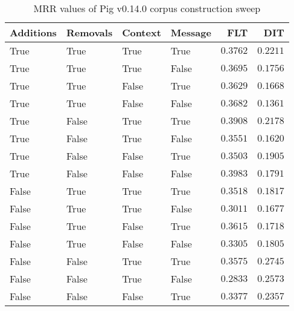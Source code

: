 
\begin{table}
\begin{spacing}{1.2}
\centering
\caption{MRR values of Pig v0.14.0 corpus construction sweep}
\label{table:pig_corpus_sweep}
\vspace{0.2em}
\begin{tabular}{llll|rr}
\toprule
Additions & Removals & Context & Message & FLT &        DIT \\
\midrule
     True &     True &    True &    True &         $0.3762$ &      $0.2211$ \\
     True &     True &    True &   False &         $0.3695$ &      $0.1756$ \\
     True &     True &   False &    True &         $0.3629$ &      $0.1668$ \\
     True &     True &   False &   False &         $0.3682$ &      $0.1361$ \\
     True &    False &    True &    True &         $0.3908$ &      $0.2178$ \\
     True &    False &    True &   False &         $0.3551$ &      $0.1620$ \\
     True &    False &   False &    True &         $0.3503$ &      $0.1905$ \\
     True &    False &   False &   False &    $\bm{0.3983}$ &      $0.1791$ \\
    False &     True &    True &    True &         $0.3518$ &      $0.1817$ \\
    False &     True &    True &   False &         $0.3011$ &      $0.1677$ \\
    False &     True &   False &    True &         $0.3615$ &      $0.1718$ \\
    False &     True &   False &   False &         $0.3305$ &      $0.1805$ \\
    False &    False &    True &    True &         $0.3575$ & $\bm{0.2745}$ \\
    False &    False &    True &   False &         $0.2833$ &      $0.2573$ \\
    False &    False &   False &    True &         $0.3377$ &      $0.2357$ \\
\bottomrule
\end{tabular}

\end{spacing}
\end{table}
